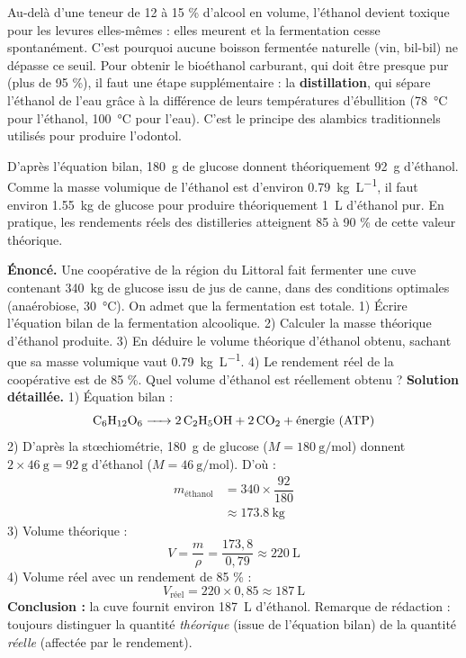 \documentclass[11pt]{article}
\begin{document}
\begin{savaistu}
Au-delà d'une teneur de 12 à 15 \% d'alcool en volume, l'éthanol devient toxique pour les levures elles-mêmes : elles meurent et la fermentation cesse spontanément. C'est pourquoi aucune boisson fermentée naturelle (vin, bil-bil) ne dépasse ce seuil. Pour obtenir le bioéthanol carburant, qui doit être presque pur (plus de 95 \%), il faut une étape supplémentaire : la \textbf{distillation}, qui sépare l'éthanol de l'eau grâce à la différence de leurs températures d'ébullition (\SI{78}{\celsius} pour l'éthanol, \SI{100}{\celsius} pour l'eau). C'est le principe des alambics traditionnels utilisés pour produire l'odontol.
\end{savaistu}

\begin{exemplebox}
D'après l'équation bilan, \SI{180}{\gram} de glucose donnent théoriquement \SI{92}{\gram} d'éthanol. Comme la masse volumique de l'éthanol est d'environ \SI{0,79}{\kilogram\per\liter}, il faut environ \SI{1,55}{\kilogram} de glucose pour produire théoriquement \SI{1}{\liter} d'éthanol pur. En pratique, les rendements réels des distilleries atteignent 85 à 90 \% de cette valeur théorique.
\end{exemplebox}

\begin{exoresolu}
\textbf{Énoncé.} Une coopérative de la région du Littoral fait fermenter une cuve contenant \SI{340}{\kilogram} de glucose issu de jus de canne, dans des conditions optimales (anaérobiose, \SI{30}{\celsius}). On admet que la fermentation est totale. 1) Écrire l'équation bilan de la fermentation alcoolique. 2) Calculer la masse théorique d'éthanol produite. 3) En déduire le volume théorique d'éthanol obtenu, sachant que sa masse volumique vaut \SI{0,79}{\kilogram\per\liter}. 4) Le rendement réel de la coopérative est de 85 \%. Quel volume d'éthanol est réellement obtenu ?
\tcblower
\textbf{Solution détaillée.}
1) Équation bilan :
\[ \ce{C6H12O6 -> 2 C2H5OH + 2 CO2} + \text{énergie (ATP)} \]
2) D'après la stœchiométrie, \SI{180}{\gram} de glucose ($M = \SI{180}{\gram\per\mol}$) donnent $2 \times \SI{46}{\gram} = \SI{92}{\gram}$ d'éthanol ($M = \SI{46}{\gram\per\mol}$). D'où :
\begin{align*}
m_{\text{éthanol}} &= 340 \times \dfrac{92}{180} \\
&\approx \SI{173,8}{\kilogram}
\end{align*}
3) Volume théorique :
\[ V = \dfrac{m}{\rho} = \dfrac{173,8}{0,79} \approx \SI{220}{\liter} \]
4) Volume réel avec un rendement de 85 \% :
\[ V_{\text{réel}} = 220 \times 0,85 \approx \SI{187}{\liter} \]
\textbf{Conclusion :} la cuve fournit environ \SI{187}{\liter} d'éthanol. Remarque de rédaction : toujours distinguer la quantité \emph{théorique} (issue de l'équation bilan) de la quantité \emph{réelle} (affectée par le rendement).
\end{exoresolu}
\end{document}
